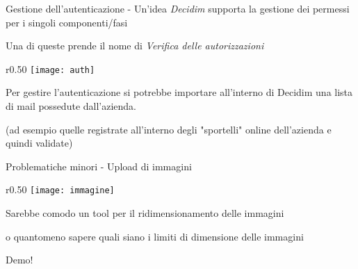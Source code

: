 \begin{frame}{Gestione dell'autenticazione - Un'idea}
  \emph{Decidim} supporta la gestione dei permessi per i singoli componenti/fasi

  Una di queste prende il nome di \emph{Verifica delle autorizzazioni}

  \begin{wrapfigure}{r}{0.50\textwidth}
    \centering
    \texttt{[image: auth]}
  \end{wrapfigure}

  Per gestire l'autenticazione si potrebbe importare all'interno di Decidim una lista di mail possedute dall'azienda.

  (ad esempio quelle registrate all'interno degli "sportelli" online dell'azienda e quindi validate)

\end{frame}

\begin{frame}{Problematiche minori - Upload di immagini}
  \begin{wrapfigure}{r}{0.50\textwidth}
    \centering
    \texttt{[image: immagine]}
  \end{wrapfigure}
  Sarebbe comodo un tool per il ridimensionamento delle immagini


  o quantomeno sapere quali siano i limiti di dimensione delle immagini


\end{frame}



{
\begin{frame}[standout]
  Demo!

\end{frame}
}
